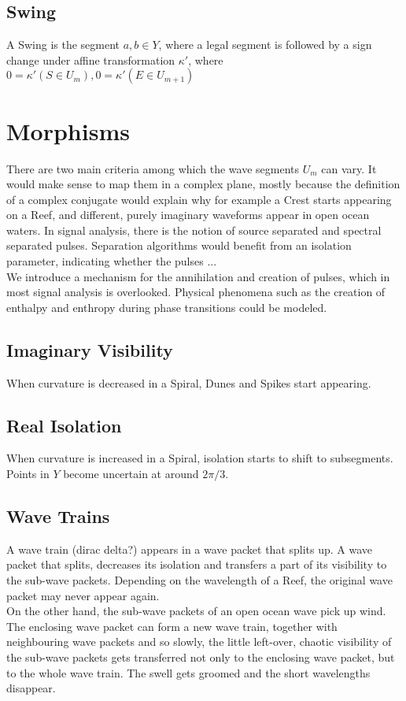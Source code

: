 \documentclass{article}
\begin{document}
\subsection{Swing}
A Swing is the segment $a,b \in Y$, where a legal segment is followed by a sign change under affine transformation $\kappa'$, where $0= \kappa'(S \in U_{m}),0= \kappa'(E \in U_{m+1})$

\section{Morphisms}
There are two main criteria among which the wave segments $U_{m}$ can vary. It would make sense to map them in a complex plane, mostly because the definition of a complex conjugate would explain why for example a Crest starts appearing on a Reef, and different, purely imaginary waveforms appear in open ocean waters. In signal analysis, there is the notion of source separated and spectral separated pulses. Separation algorithms would benefit from an isolation parameter, indicating whether the pulses ...\\
We introduce a mechanism for the annihilation and creation of pulses, which in most signal analysis is overlooked. Physical phenomena such as the creation of enthalpy and enthropy during phase transitions could be modeled.

\subsection{Imaginary Visibility}
When curvature is decreased in a Spiral, Dunes and Spikes start appearing.

\subsection{Real Isolation}
When curvature is increased in a Spiral, isolation starts to shift to subsegments. Points in $Y$ become uncertain at around $2\pi/3$.

\subsection{Wave Trains}
A wave train (dirac delta?) appears in a wave packet that splits up. A wave packet that splits, decreases its isolation and transfers a part of its visibility to the sub-wave packets. Depending on the wavelength of a Reef, the original wave packet may never appear again.\\
On the other hand, the sub-wave packets of an open ocean wave pick up wind. The enclosing wave packet can form a new wave train, together with neighbouring wave packets and so slowly, the little left-over, chaotic visibility of the sub-wave packets gets transferred not only to the enclosing wave packet, but to the whole wave train. The swell gets groomed and the short wavelengths disappear.

\printbibliography
\end{document}
